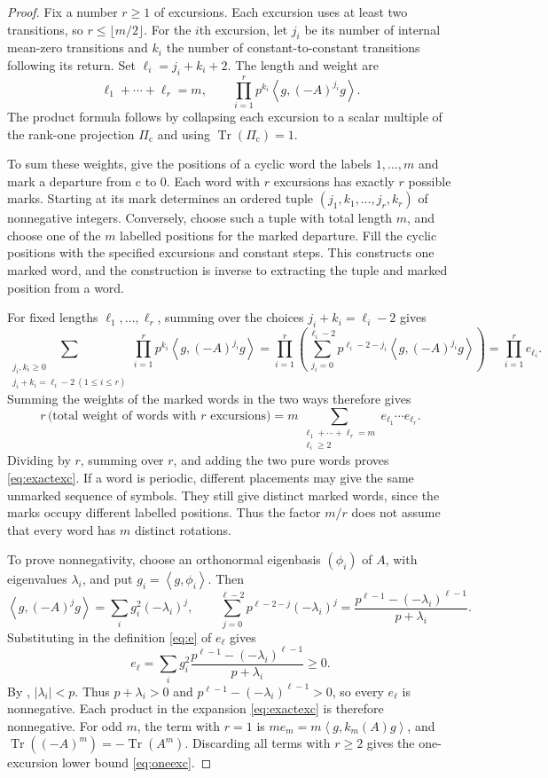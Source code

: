 \documentclass[11pt]{article}
\numberwithin{equation}{section}
\newcommand{\Tr}{\operatorname{Tr}}
\newcommand{\ip}[2]{\left\langle #1,#2\right\rangle}
\begin{document}
\begin{proof}
Fix a number $r\ge1$ of excursions. Each excursion uses at least
two transitions, so $r\le\lfloor m/2\rfloor$. For the $i$th
excursion, let $j_i$ be its number of internal mean-zero transitions
and $k_i$ the number of constant-to-constant transitions following
its return. Set $\ell_i=j_i+k_i+2$. The length and weight are
\[
 \ell_1+\cdots+\ell_r=m,\qquad
 \prod_{i=1}^r p^{k_i}\ip g{(-A)^{j_i}g}.
\]
The product formula follows by collapsing each excursion to a
scalar multiple of the rank-one projection $\Pi_{\mathrm c}$ and
using $\Tr(\Pi_{\mathrm c})=1$.

To sum these weights, give the positions of a cyclic word the labels
$1,\ldots,m$ and mark a departure from $\mathrm c$ to $0$.
Each word with $r$ excursions has exactly $r$ possible marks.
Starting at its mark determines an ordered tuple
$(j_1,k_1,\ldots,j_r,k_r)$ of nonnegative integers.
Conversely, choose such a tuple with total length $m$, and choose
one of the $m$ labelled positions for the marked departure. Fill
the cyclic positions with the specified excursions and constant
steps. This constructs one marked word, and the construction is
inverse to extracting the tuple and marked position from a word.

For fixed lengths $\ell_1,\ldots,\ell_r$, summing over the choices
$j_i+k_i=\ell_i-2$ gives
\[
 \sum_{\substack{j_i,k_i\ge0\\j_i+k_i=\ell_i-2\ (1\le i\le r)}}
 \prod_{i=1}^r p^{k_i}\ip g{(-A)^{j_i}g}
 =\prod_{i=1}^r\left(
   \sum_{j_i=0}^{\ell_i-2}p^{\ell_i-2-j_i}\ip g{(-A)^{j_i}g}
   \right)
 =\prod_{i=1}^r e_{\ell_i}.
\]
Summing the weights of the marked words in the two ways therefore gives
\[
 r\,\bigl(\text{total weight of words with $r$ excursions}\bigr)
 =m\sum_{\substack{\ell_1+\cdots+\ell_r=m\\\ell_i\ge2}}
 e_{\ell_1}\cdots e_{\ell_r}.
\]
Dividing by $r$, summing over $r$, and adding the two pure words
proves \eqref{eq:exactexc}. If a word is periodic, different
placements may give the same unmarked sequence of symbols. They
still give distinct marked words, since the marks occupy different
labelled positions. Thus the factor $m/r$ does not assume that
every word has $m$ distinct rotations.

To prove nonnegativity, choose an orthonormal eigenbasis $(\phi_i)$
of $A$, with eigenvalues $\lambda_i$, and put $g_i=\ip g{\phi_i}$.
Then
\[
 \ip g{(-A)^jg}=\sum_i g_i^2(-\lambda_i)^j,
 \qquad
 \sum_{j=0}^{\ell-2}p^{\ell-2-j}(-\lambda_i)^j
  =\frac{p^{\ell-1}-(-\lambda_i)^{\ell-1}}{p+\lambda_i}.
\]
Substituting in the definition \eqref{eq:e} of $e_\ell$ gives
\begin{equation}\label{eq:epos}
 e_\ell=\sum_i g_i^2\frac{p^{\ell-1}-(-\lambda_i)^{\ell-1}}{p+\lambda_i}\ge0.
\end{equation}
By , $|\lambda_i|<p$. Thus $p+\lambda_i>0$ and
$p^{\ell-1}-(-\lambda_i)^{\ell-1}>0$, so every $e_\ell$ is
nonnegative. Each product in the expansion \eqref{eq:exactexc}
is therefore nonnegative. For odd $m$, the term with $r=1$ is
$m e_m=m\ip g{k_m(A)g}$, and
$\Tr((-A)^m)=-\Tr(A^m)$. Discarding all terms with $r\ge2$
gives the one-excursion lower bound \eqref{eq:oneexc}.
\end{proof}
\end{document}
